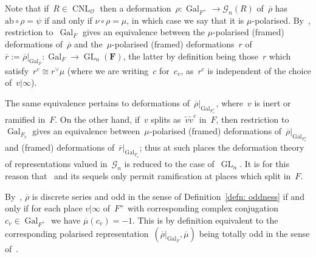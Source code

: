 \documentclass{amsart}
\renewcommand{\mathbb}{\mathbf}
\newcommand{\CNL}{\operatorname{CNL}}
\newcommand{\tv}{{\widetilde{v}}}
\newcommand{\mubar}{\overline{\mu}}
\theoremstyle{definition}
\theoremstyle{remark}
\newcommand{\mar}[1]{}
\newcommand{\mar}[1]{\marginpar{\raggedright\tiny squirrel #1}}
\newcommand{\F}{\FF}
\newcommand{\m}{\frakm}
\newcommand{\FF}{{\mathbb F}}
\newcommand{\cG}{{\mathcal G}}
\newcommand{\cO}{{\mathcal O}}
\newcommand{\frakm}{\mathfrak{m}}
\DeclareMathOperator{\Gal}{Gal}
\DeclareMathOperator{\GL}{GL}
\newcommand{\ab}{\mathrm{ab}}
\newcommand{\rhobar}{\overline{\rho}}
\newcommand{\rbar}{\overline{r}}
\begin{document}
Note that if~$R\in\CNL_\cO$ then a
deformation~$\rho:\Gal_{F^+}\to\cG_n(R)$ of~$\rhobar$ has
$\ab\circ\rho=\psi$ if and only if $\nu\circ\rho=\mu$, in which case
we say that it is $\mu$-polarised. By~\cite[Prop.\
2.2.3]{2016arXiv160103752A}, restriction to~$\Gal_F$ gives an
equivalence between the $\mu$-polarised (framed) deformations of~$\rhobar$ and
the~$\mu$-polarised (framed) deformations~$r$
of~$\rbar:=\rhobar|_{\Gal_F}:\Gal_F\to\GL_n(\F)$, the latter by definition
being those~$r$ which satisfy~$r^{c}\cong r^\vee\mu$ (where we are
writing~$c$ for~$c_v$, as~$r^c$ is independent of the choice
of~$v|\infty$). 

The same equivalence pertains to deformations
of~$\rhobar|_{\Gal_{F^+_v}}$, where~$v$ is inert or ramified
in~$F$. On the other hand, if~$v$ splits as~$\tv\tv^c$ in~$F$, then
restriction to~$\Gal_{F_{\tv}}$ gives an equivalence
between~$\mu$-polarised (framed) deformations
of~$\rhobar|_{\Gal_{F^+_v}}$ and (framed) deformations
of~$\rbar|_{\Gal_{F_{\tv}}}$; thus at such places the deformation
theory of representations valued in~$\cG_n$ is reduced to the case
of~$\GL_n$. It is for this reason that~\cite{CHT} and its sequels only
permit ramification at places which split in~$F$.



By~\cite[Lem.\ 2.1.3]{CHT}, $\rhobar$ is discrete series and odd in
the sense of Definition~\ref{defn: oddness} if and only if for each
place $v|\infty$ of~$F^+$ with corresponding complex conjugation~$c_v\in\Gal_{F^+}$
we have $\mubar(c_v)=-1$. This is by definition equivalent to the
corresponding polarised representation~$(\rhobar|_{\Gal_F},\mubar)$
being totally odd in the sense of~\cite[\S 2.1]{BLGGT}.


\end{document}
